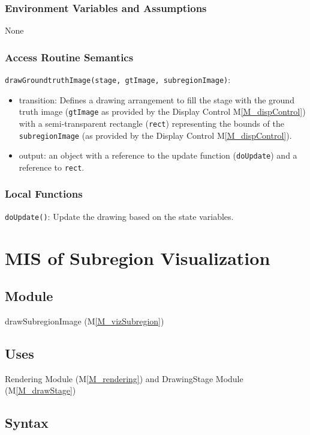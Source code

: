 \documentclass[12pt, titlepage]{article}
\newcommand{\mref}[1]{M\ref{#1}}
\newcommand{\mrefp}[1]{(\mref{#1})}
\newcommand{\mreff}[1]{Module \mrefp{#1}}
\newcommand{\code}[1]{\texttt{#1}}
\begin{document}
\subsubsection{Environment Variables and Assumptions}
None

\subsubsection{Access Routine Semantics}

\noindent \code{drawGroundtruthImage(stage, gtImage, subregionImage)}:
\begin{itemize}
\item transition: Defines a drawing arrangement to fill the stage with the ground truth image
  (\code{gtImage} as provided by the Display Control \mref{M_dispControl})
  with a semi-transparent rectangle (\code{rect}) representing the bounds of the
  \code{subregionImage} (as provided by the Display Control \mref{M_dispControl}).
\item output: an object with a reference to the update function (\code{doUpdate}) and a reference to \code{rect}.
\end{itemize}

\subsubsection{Local Functions}
\code{doUpdate()}: Update the drawing based on the state variables.

\newpage



\section{MIS of Subregion Visualization} \label{MS_vizSubregion}

\subsection{Module}
drawSubregionImage \mrefp{M_vizSubregion}

\subsection{Uses}
Rendering \mreff{M_rendering} and DrawingStage \mreff{M_drawStage}

\subsection{Syntax}
\end{document}

